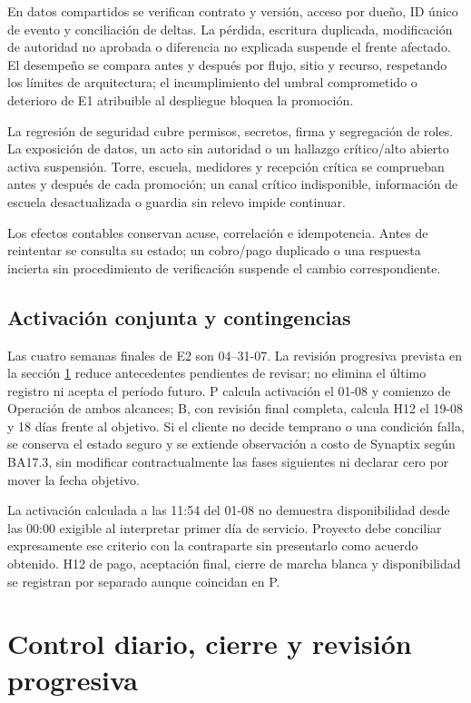 En datos compartidos se verifican contrato y versión, acceso por dueño, ID único de evento y conciliación de deltas. La pérdida, escritura duplicada, modificación de autoridad no aprobada o diferencia no explicada suspende el frente afectado. El desempeño se compara antes y después por flujo, sitio y recurso, respetando los límites de arquitectura; el incumplimiento del umbral comprometido o deterioro de E1 atribuible al despliegue bloquea la promoción.

La regresión de seguridad cubre permisos, secretos, firma y segregación de roles. La exposición de datos, un acto sin autoridad o un hallazgo crítico/alto abierto activa suspensión. Torre, escuela, medidores y recepción crítica se comprueban antes y después de cada promoción; un canal crítico indisponible, información de escuela desactualizada o guardia sin relevo impide continuar.

Los efectos contables conservan acuse, correlación e idempotencia. Antes de reintentar se consulta su estado; un cobro/pago duplicado o una respuesta incierta sin procedimiento de verificación suspende el cambio correspondiente.


\subsection{Activación conjunta y contingencias}
Las cuatro semanas finales de E2 son 04--31-07. La revisión progresiva prevista en la sección \ref{sec:t18-control} reduce antecedentes pendientes de revisar; no elimina el último registro ni acepta el período futuro. P calcula activación el 01-08 y comienzo de Operación de ambos alcances; B, con revisión final completa, calcula H12 el 19-08 y 18 días frente al objetivo. Si el cliente no decide temprano o una condición falla, se conserva el estado seguro y se extiende observación a costo de Synaptix según BA17.3, sin modificar contractualmente las fases siguientes ni declarar cero por mover la fecha objetivo.

La activación calculada a las 11:54 del 01-08 no demuestra disponibilidad desde las 00:00 exigible al interpretar primer día de servicio. Proyecto debe conciliar expresamente ese criterio con la contraparte sin presentarlo como acuerdo obtenido. H12 de pago, aceptación final, cierre de marcha blanca y disponibilidad se registran por separado aunque coincidan en P.

\section{Control diario, cierre y revisión progresiva}\label{sec:t18-control}
